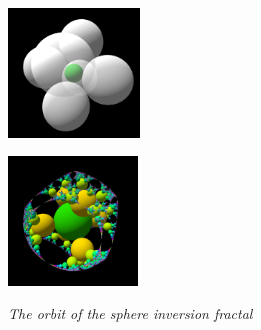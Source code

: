 \begin{figure}[htbp]
 \begin{minipage}[t]{0.5\hsize}
  \center
  \includegraphics[height=1.35in, keepaspectratio]{img/preparation/3dExtension/3dKissingGenerator.png}
  \label{fig:simpleGen}
  \hspace*{\fill}
 \end{minipage}
 \begin{minipage}[t]{0.5\hsize}
  \center
  \includegraphics[height=1.35in, keepaspectratio]{img/preparation/3dExtension/3dOrbit.png}
  \label{fig:simpleOrb}
  \hspace*{\fill}
 \end{minipage}
 \caption{\textit{The orbit of the sphere inversion fractal}}
 \label{fig:simpleGenOrb}
\end{figure}


